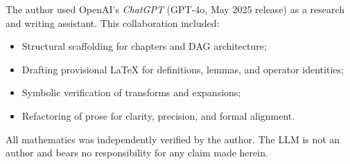 The author used OpenAI’s \emph{ChatGPT} (GPT-4o, May 2025 release) as a research and writing assistant. This collaboration included:

\begin{itemize}
  \item Structural scaffolding for chapters and DAG architecture;
  \item Drafting provisional \LaTeX{} for definitions, lemmas, and operator identities;
  \item Symbolic verification of transforms and expansions;
  \item Refactoring of prose for clarity, precision, and formal alignment.
\end{itemize}

All mathematics was independently verified by the author. The LLM is not an author and bears no responsibility for any claim made herein.
